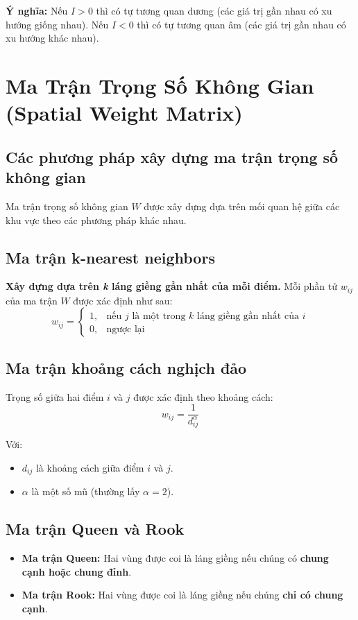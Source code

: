 \textbf{Ý nghĩa:} Nếu $I > 0$ thì có tự tương quan dương (các giá trị gần nhau có xu hướng giống nhau). Nếu $I < 0$ thì có tự tương quan âm (các giá trị gần nhau có xu hướng khác nhau).

\section{Ma Trận Trọng Số Không Gian (Spatial Weight Matrix)}
\subsection{Các phương pháp xây dựng ma trận trọng số không gian}
Ma trận trọng số không gian $W$ được xây dựng dựa trên mối quan hệ giữa các khu vực theo các phương pháp khác nhau.

\subsection{Ma trận k-nearest neighbors}
\textbf{Xây dựng dựa trên \textit{k} láng giềng gần nhất của mỗi điểm.}
Mỗi phần tử $w_{ij}$ của ma trận $W$ được xác định như sau:
\begin{equation}
    w_{ij} =
    \begin{cases}
        1, & \text{nếu } j \text{ là một trong } k \text{ láng giềng gần nhất của } i \\
        0, & \text{ngược lại}
    \end{cases}
\end{equation}

\subsection{Ma trận khoảng cách nghịch đảo}
Trọng số giữa hai điểm $i$ và $j$ được xác định theo khoảng cách:
\begin{equation}
    w_{ij} = \frac{1}{d_{ij}^\alpha}
\end{equation}

Với:
\begin{itemize}
    \item $d_{ij}$ là khoảng cách giữa điểm $i$ và $j$.
    \item $\alpha$ là một số mũ (thường lấy $\alpha = 2$).
\end{itemize}

\subsection{Ma trận Queen và Rook}
\begin{itemize}
    \item \textbf{Ma trận Queen:} Hai vùng được coi là láng giềng nếu chúng có \textbf{chung cạnh hoặc chung đỉnh}.
    \item \textbf{Ma trận Rook:} Hai vùng được coi là láng giềng nếu chúng \textbf{chỉ có chung cạnh}.
\end{itemize}
